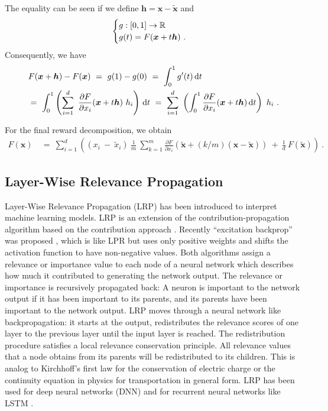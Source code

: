 \documentclass{article}
\newcommand\Bh{\bm{h}}
\newcommand\Bx{\bm{x}}
\begin{document}
\begin{appendices}
The equality can be seen if we define $\Bh=\Bx-\tilde{\Bx}$ and
\begin{align}
\begin{cases}
  g:[0,1]\to \dR \\
  g(t)=F(\Bx+t \Bh) \ .
\end{cases}
\end{align}
Consequently, we have
\begin{align}
  &F(\Bx+\Bh)-F(\Bx) \ = \ g(1)-g(0) \ = \
  \int _{0}^{1} g'(t)\, \Rd t\\
  &= \ \int _{0}^{1} \left(\sum_{i=1}^{d} \
    \frac{\partial F}{\partial x_i}(\Bx+t \Bh) \ h_i\right) \, \Rd t
  \ = \ \sum _{i=1}^{d} \ \left(\int _{0}^{1}
    \frac{\partial F}{\partial x_i}(\Bx+t \Bh)\, \Rd t\right) \ h_i \ .
\end{align}

For the final reward decomposition, we obtain
\begin{align}
 F(\Bx)  \ &= \ 
 \sum_{i=1}^d \left( (x_i \ - \ \tilde{x}_i) \ \frac{1}{m} \ \sum_{k=1}^m
   \frac{\partial F}{\partial x_i}(\tilde{\Bx}+ (k/m)
 (\Bx-\tilde{\Bx})) 
  \ + \ \frac{1}{d} \ F(\tilde{\Bx}) \right) \ .
 \end{align}


\subsection{Layer-Wise Relevance Propagation}
\label{sec:ALRP}

Layer-Wise Relevance Propagation (LRP) \cite{Bach:15}
has been introduced to interpret machine learning models.
LRP is an extension of
the contribution-propagation algorithm \cite{Landecker:13} based on
the contribution approach \cite{Poulin:06}.
Recently ``excitation backprop'' was proposed \cite{Zhang:16},
which is like LPR but uses only positive weights and shifts the
activation function to have non-negative values.
Both algorithms assign a relevance or importance value
to each node of a neural network which describes how much
it contributed to generating the network output.
The relevance or importance is recursively propagated back:
A neuron is important to the network output if it has been important to its
parents, and its parents have been important to the network output.
LRP moves through a neural network like backpropagation:
it starts at the output, redistributes the relevance scores of one
layer to the previous layer until the input layer is reached.
The redistribution procedure satisfies a local relevance
conservation principle. All relevance values that a node obtains from its parents will be
redistributed to its children.
This is analog to Kirchhoff's first law for the conservation of electric charge
or the continuity equation in physics for transportation in general form.
LRP has been used for deep neural networks (DNN) \cite{Montavon:17} and
for recurrent neural networks like LSTM \cite{Arras:17}.


\end{appendices}
\end{document}
